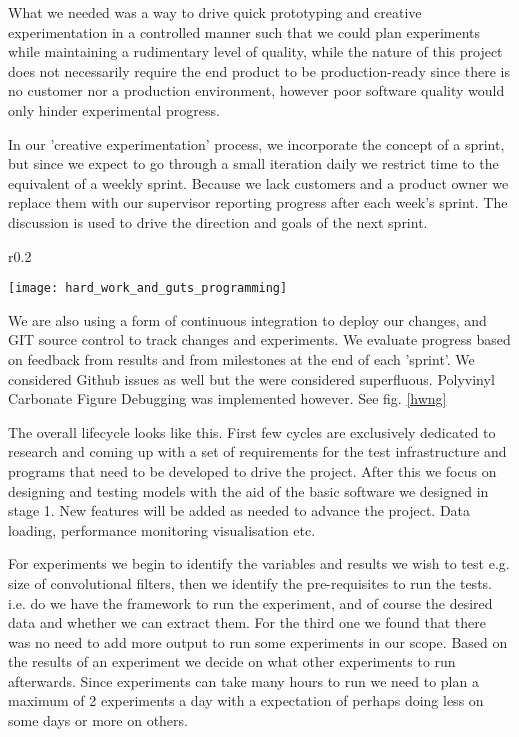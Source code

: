 What we needed was a way to drive quick prototyping and creative experimentation in a controlled manner such that we could plan experiments while maintaining a rudimentary level of quality, while the nature of this project does not necessarily require the end product to be production-ready since there is no customer nor a production environment, however poor software quality would only hinder experimental progress.

In our 'creative experimentation' process, we incorporate the concept of a sprint, but since we expect to go through a small iteration daily we restrict time to the equivalent of a weekly sprint. Because we lack customers and a product owner we replace them with our supervisor reporting progress after each week's sprint. The discussion is used to drive the direction and goals of the next sprint.

\begin{wrapfigure}{r}{0.2\textwidth}
	\begin{center}
		\texttt{[image: hard\_work\_and\_guts\_programming]}
	\end{center}
	\caption{A Prety Soldier of Hard Word and Guts: Takaya Noriko}
	\label{hwng}
\end{wrapfigure}

We are also using a form of continuous integration to deploy our changes, and GIT source control to track changes and experiments. We evaluate progress based on feedback from results and from milestones at the end of each 'sprint'. We considered Github issues as well but the were considered superfluous. Polyvinyl Carbonate Figure Debugging was implemented however. See fig. \ref{hwng}

The overall lifecycle looks like this. First few cycles are exclusively dedicated to research and coming up with a set of requirements for the test infrastructure and programs that need to be developed to drive the project. After this we focus on designing and testing models with the aid of the basic software we designed in stage 1. New features will be added as needed to advance the project. Data loading, performance monitoring visualisation etc.

For experiments we begin to identify the variables and results we wish to test e.g. size of convolutional filters, then we identify the pre-requisites to run the tests. i.e. do we have the framework to run the experiment, and of course the desired data and whether we can extract them. For the third one we found that there was no need to add more output to run some experiments in our scope. Based on the results of an experiment we decide on what other experiments to run afterwards. Since experiments can take many hours to run we need to plan a maximum of 2 experiments a day with a expectation of perhaps doing less on some days or more on others.

